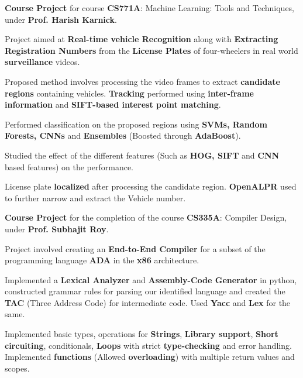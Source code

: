 \documentclass[a4paper]{norm-resume}
\begin{document}
	\begin{tightitemize}
	\small
	{
	\item \textbf{Course Project} for course \textbf{CS771A}: Machine Learning: Tools and Techniques, under \textbf{Prof. Harish Karnick}.
	\item Project aimed at \textbf{Real-time vehicle Recognition} along with \textbf{Extracting Registration Numbers} from the \textbf{License Plates} of four-wheelers in real world \textbf{surveillance} videos.
	\item Proposed method involves processing the video frames to extract \textbf{candidate regions} containing vehicles. \textbf{Tracking} performed using \textbf{inter-frame information} and \textbf{SIFT-based interest point matching}.
	\item Performed classification on the proposed regions using \textbf{SVMs, Random Forests, CNNs} and \textbf{Ensembles} (Boosted through \textbf{AdaBoost}).
	\item Studied the effect of the different features (Such as \textbf{HOG, SIFT} and \textbf{CNN} based features) on the performance.
	\item License plate \textbf{localized} after processing the candidate region. \textbf{OpenALPR} used to further narrow and extract the Vehicle number.
	}
	\end{tightitemize}

	\vspace{2mm}

	\runsubsection{ADA Compiler:}
	\descript{Jan '16 - Apr '16}	
	\begin{tightitemize}
	\small
	{
	\item \textbf{Course Project} for the completion of the course \textbf{CS335A}: Compiler Design, under \textbf{Prof. Subhajit Roy}.
	\item Project involved creating an \textbf{End-to-End Compiler} for a subset of the programming language \textbf{ADA} in the \textbf{x86} architecture.
	\item Implemented a \textbf{Lexical Analyzer} and \textbf{Assembly-Code Generator} in python, constructed grammar rules for parsing our identified language and created the \textbf{TAC} (Three Address Code) for intermediate code. Used \textbf{Yacc} and \textbf{Lex} for the same.
	\item Implemented basic types, operations for \textbf{Strings}, \textbf{Library support}, \textbf{Short circuiting}, conditionals, \textbf{Loops} with strict \textbf{type-checking} and error handling. Implemented \textbf{functions} (Allowed \textbf{overloading}) with multiple return values and scopes.	
	}
	\end{tightitemize}
\end{document}
